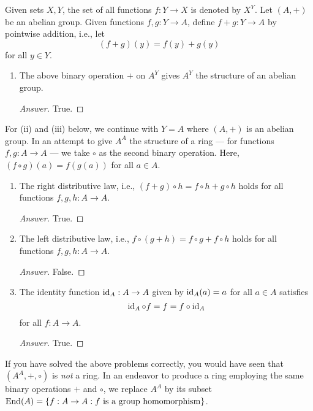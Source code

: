 \documentclass[../psets.tex]{subfiles}
\begin{document}
\begin{enumerate}[resume]
    Given sets $X,Y$, the set of all functions $f:Y\to X$ is denoted by $X^Y$. Let $(A,+)$ be an abelian group. Given functions $f,g:Y\to A$, define $f+g:Y\to A$ by pointwise addition, i.e., let
    \begin{equation*}
        (f+g)(y) = f(y)+g(y)
    \end{equation*}
    for all $y\in Y$.
    \begin{enumerate}
        \item The above binary operation $+$ on $A^Y$ gives $A^Y$ the structure of an abelian group.
        \begin{proof}[Answer]
            True.
        \end{proof}
    \end{enumerate}
    For (ii) and (iii) below, we continue with $Y=A$ where $(A,+)$ is an abelian group. In an attempt to give $A^A$ the structure of a ring --- for functions $f,g:A\to A$ --- we take $\circ$ as the second binary operation. Here, $(f\circ g)(a)=f(g(a))$ for all $a\in A$.
    \begin{enumerate}[resume]
        \item The right distributive law, i.e., $(f+g)\circ h=f\circ h+g\circ h$ holds for all functions $f,g,h:A\to A$.
        \begin{proof}[Answer]
            True.
        \end{proof}
        \item The left distributive law, i.e., $f\circ(g+h)=f\circ g+f\circ h$ holds for all functions $f,g,h:A\to A$.
        \begin{proof}[Answer]
            False.
        \end{proof}
        \item The identity function $\operatorname{id}_A:A\to A$ given by $\operatorname{id}_A(a)=a$ for all $a\in A$ satisfies
        \begin{equation*}
            \operatorname{id}_A\circ f = f = f\circ\operatorname{id}_A
        \end{equation*}
        for all $f:A\to A$.
        \begin{proof}[Answer]
            True.
        \end{proof}
    \end{enumerate}
    If you have solved the above problems correctly, you would have seen that $(A^A,+,\circ)$ is \emph{not} a ring. In an endeavor to produce a ring employing the same binary operations $+$ and $\circ$, we replace $A^A$ by its subset $\operatorname{End}(A)=\{f:A\to A:f\text{ is a group homomorphism}\}$.
    \begin{enumerate}[resume]

\end{enumerate}
\end{enumerate}
\end{document}
